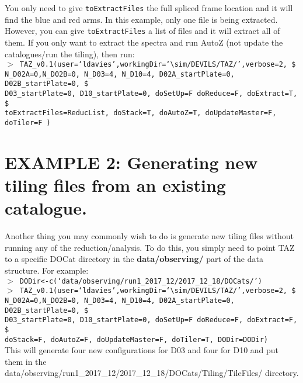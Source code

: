 \documentclass[12pt]{article}
\begin{document}
You only need to give  \texttt{toExtractFiles} the full spliced frame location and it will find the blue and red arms. In this example, only one file is being extracted. However, you can give \texttt{toExtractFiles} a list of files and it will extract all of them. If you only want to extract the spectra and run AutoZ (not update the catalogues/run the tiling), then run: \\

 \hspace{10mm} \texttt{$>$ TAZ\_v0.1(user=`ldavies',workingDir=`$\sim$/DEVILS/TAZ/',verbose=2, \$ \\
N\_D02A=0,N\_D02B=0, N\_D03=4, N\_D10=4, D02A\_startPlate=0, D02B\_startPlate=0, \$ \\ 
D03\_startPlate=0, D10\_startPlate=0, doSetUp=F doReduce=F, doExtract=T,   \$ \\
toExtractFiles=ReducList, doStack=T,  doAutoZ=T, doUpdateMaster=F, doTiler=F ) }\\  
 

\section{EXAMPLE 2: Generating new tiling files from an existing catalogue.}

Another thing you may commonly wish to do is generate new tiling files without running any of the reduction/analysis. To do this, you simply need to point TAZ to a specific DOCat directory in the \textbf{data/observing/} part of the data structure. For example:\\

 \hspace{10mm} \texttt{$>$ DODir<-c(`data/observing/run1\_2017\_12/2017\_12\_18/DOCats/')}\\

 \hspace{10mm} \texttt{$>$ TAZ\_v0.1(user=`ldavies',workingDir=`$\sim$/DEVILS/TAZ/',verbose=2, \$ \\
N\_D02A=0,N\_D02B=0, N\_D03=4, N\_D10=4, D02A\_startPlate=0, D02B\_startPlate=0, \$ \\ 
D03\_startPlate=0, D10\_startPlate=0, doSetUp=F doReduce=F, doExtract=F,   \$ \\
 doStack=F,  doAutoZ=F, doUpdateMaster=F, doTiler=T, DODir=DODir) }\\  

This will generate four new configurations for D03 and four for D10 and put them in the data/observing/run1\_2017\_12/2017\_12\_18/DOCats/Tiling/TileFiles/ directory. 
\end{document}

